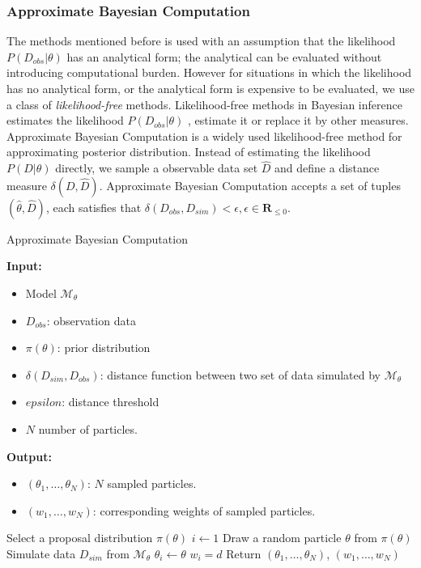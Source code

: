 \subsubsection{Approximate Bayesian Computation}
The methods mentioned before is used with an assumption that the likelihood $P(D_{obs}|\theta)$ has
an analytical form; the analytical can be evaluated without introducing computational burden.
However for situations in which the likelihood has no analytical form, or the analytical form is
expensive to be evaluated, we use a class of \textit{likelihood-free} methods. Likelihood-free
methods in Bayesian inference estimates the likelihood $P(D_{obs}|\theta)$ ,
estimate it or replace it by other measures. Approximate Bayesian Computation is a widely used
likelihood-free method for approximating posterior distribution. Instead of estimating the
likelihood $P(D|\theta)$ directly, we sample a observable data set $\hat{D}$ and define a distance
measure $\delta(D, \hat{D})$. Approximate Bayesian Computation accepts a set of tuples
$(\hat{\theta}, \hat{D})$, each satisfies that $\delta(D_{obs},D_{sim}) < \epsilon,
    \epsilon\in\mathbf{R}_{\leq 0}$.
\begin{algorithm}[H]
    \caption{Approximate Bayesian Computation}
    \label{alg:abc-reject}
    \footnotesize{
        \hspace*{\algorithmicindent} \textbf{Input:}
        \begin{itemize}[noitemsep]
            \item Model $\mathcal{M}_\theta$
            \item $D_{obs}$: observation data
            \item $\pi(\theta)$: prior distribution
            \item $\delta(D_{sim}, D_{obs})$: distance function between two set of data simulated by $\mathcal{M}_\theta$
            \item $epsilon$: distance threshold
            \item $N$ number of particles.
        \end{itemize}
        \hspace*{\algorithmicindent} \textbf{Output:}
        \begin{itemize}[noitemsep]
            \item $(\theta_1,\ldots,\theta_N)$: $N$ sampled particles.
            \item $(w_1,\ldots,w_N)$: corresponding weights of sampled particles.
        \end{itemize}
    }
    \begin{algorithmic}[1]
        \State Select a proposal distribution $\pi(\theta)$
        \State $i \leftarrow 1$
        \State Draw a random particle $\theta$ from $\pi(\theta)$
        \State Simulate data $D_{sim}$ from $\mathcal{M}_\theta$
        \State $\theta_i \leftarrow \theta$
        \State $w_i = d$
        \EndIf
        \EndWhile
        \State Return $(\theta_1,\ldots,\theta_N)$, $(w_1,\ldots,w_N)$
        \EndProcedure
    \end{algorithmic}
\end{algorithm}
